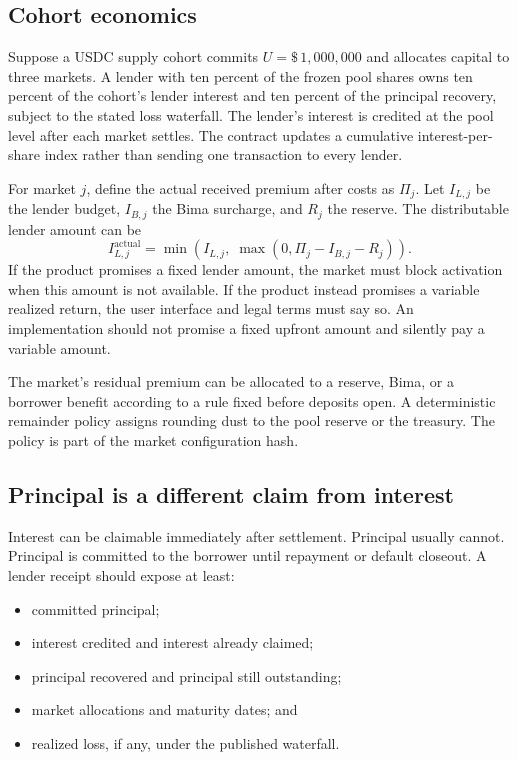 \documentclass[11pt,oneside]{article}
\newcommand{\dollar}[1]{\$\,#1}
\begin{document}
\subsection{Cohort economics}

Suppose a USDC supply cohort commits $U=\dollar{1{,}000{,}000}$ and allocates capital to three markets. A lender with ten percent of the frozen pool shares owns ten percent of the cohort's lender interest and ten percent of the principal recovery, subject to the stated loss waterfall. The lender's interest is credited at the pool level after each market settles. The contract updates a cumulative interest-per-share index rather than sending one transaction to every lender.

For market $j$, define the actual received premium after costs as $\Pi_j$. Let $I_{L,j}$ be the lender budget, $I_{B,j}$ the Bima surcharge, and $R_j$ the reserve. The distributable lender amount can be
\[
I_{L,j}^{\mathrm{actual}}=\min\left(I_{L,j},\;\max\left(0,\Pi_j-I_{B,j}-R_j\right)\right).
\]
If the product promises a fixed lender amount, the market must block activation when this amount is not available. If the product instead promises a variable realized return, the user interface and legal terms must say so. An implementation should not promise a fixed upfront amount and silently pay a variable amount.

The market's residual premium can be allocated to a reserve, Bima, or a borrower benefit according to a rule fixed before deposits open. A deterministic remainder policy assigns rounding dust to the pool reserve or the treasury. The policy is part of the market configuration hash.

\subsection{Principal is a different claim from interest}

Interest can be claimable immediately after settlement. Principal usually cannot. Principal is committed to the borrower until repayment or default closeout. A lender receipt should expose at least:

\begin{itemize}
\item committed principal;
\item interest credited and interest already claimed;
\item principal recovered and principal still outstanding;
\item market allocations and maturity dates; and
\item realized loss, if any, under the published waterfall.
\end{itemize}
\end{document}
